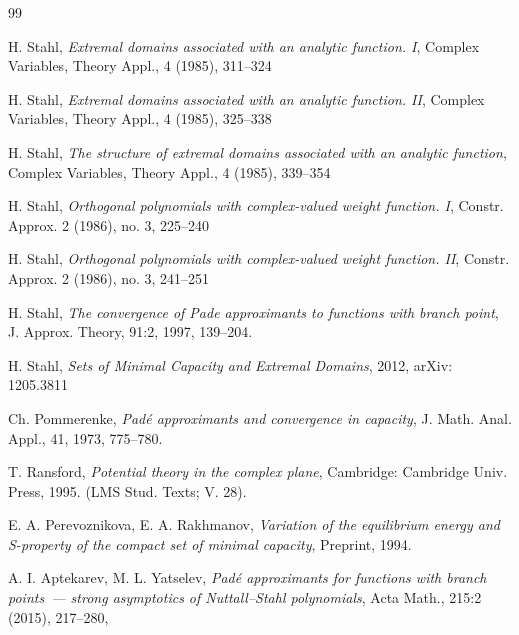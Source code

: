 \documentclass[12pt]{article}
\begin{document}
\begin{thebibliography}{99}




H. Stahl, \textit{Extremal domains associated with an analytic function. I},  Complex Variables, Theory Appl., 4 (1985), 311--324

H. Stahl, \textit{Extremal domains associated with an analytic function. II}, Complex Variables, Theory Appl., 4 (1985), 325--338

H. Stahl, \textit{The structure of extremal domains associated with an analytic function}, Complex Variables, Theory
Appl., 4 (1985), 339--354

H. Stahl, \textit{Orthogonal polynomials with complex-valued weight function. I},
Constr. Approx. 2 (1986), no. 3, 225--240

H. Stahl, \textit{Orthogonal polynomials with complex-valued weight function. II},
Constr. Approx. 2 (1986), no. 3, 241--251


H. Stahl, \textit{The convergence of Pade approximants to functions with branch point}, J. Approx. Theory, 91:2, 1997, 139--204.

 H. Stahl, \textit{Sets of Minimal Capacity and Extremal Domains}, 2012, arXiv: 1205.3811



 Ch. Pommerenke, \textit{Pad\'e approximants and convergence in capacity}, J. Math. Anal. Appl., 41, 1973, 775--780.


T. Ransford, \textit{Potential theory in the complex plane}, Cambridge: Cambridge Univ. Press, 1995. (LMS Stud. Texts; V. 28).

 E. A. Perevoznikova, E. A. Rakhmanov, \textit{Variation of the equilibrium energy and
S-property of the compact set of minimal capacity}, Preprint, 1994.

 A. I. Aptekarev, M. L. Yatselev, \textit{Pad\'e approximants for functions with branch points~--- strong asymptotics of Nuttall--Stahl polynomials}, Acta Math., 215:2 (2015), 217--280,


\end{thebibliography}
\end{document}
